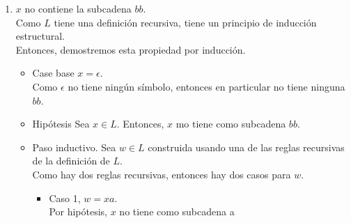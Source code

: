 \documentclass{article}
\begin{document}
\begin{enumerate}
{\begin{enumerate}
{\begin{itemize}
{\begin{itemize}
{                                    Case 2, $w = xba$.\\
                                    Entonces, $n_a(xba) = n_a(x) + 1$ y
                                    $n_b(xba) = n_b(x) + 1$.\\ 
                                    Y por hipótesis, tenemos que 
                                    $n_a(x) \geq n_b(x)$, por lo que que 
                                    $n_a(xba) = n_a(x) + 1 \geq n_b(x) + 1 
                                    = n_b(xba)$.
                                }
                            \end{itemize}
                        }
                    \end{itemize}
                }
                \item {
                    $x$ no contiene la subcadena $bb$.\\
                    Como $L$ tiene una definición recursiva, tiene un principio 
                    de inducción estructural.\\
                    Entonces, demostremos esta propiedad por inducción.
                    \begin{itemize}
                        \item {
                            Case base $x = \epsilon$.\\
                            Como $\epsilon$ no tiene ningún símbolo, entonces en
                            particular no tiene ninguna $bb$.
                        }
                        \item {
                            Hipótesis
                            Sea $x \in L$. Entonces, $x$ mo tiene como subcadena 
                            $bb$.
                        }
                        \item {
                            Paso inductivo.
                            Sea $w \in L$ construida usando una de las reglas 
                            recursivas de la definición de $L$.\\
                            Como hay dos reglas recursivas, entonces hay dos 
                            casos para $w$.
                            \begin{itemize}
                                \item {
                                    Caso 1, $w = xa$.\\
                                    Por hipótesis, $x$ no tiene como subcadena a
}
\end{itemize}}
\end{itemize}}
\end{enumerate}}
\end{enumerate}
\end{document}
